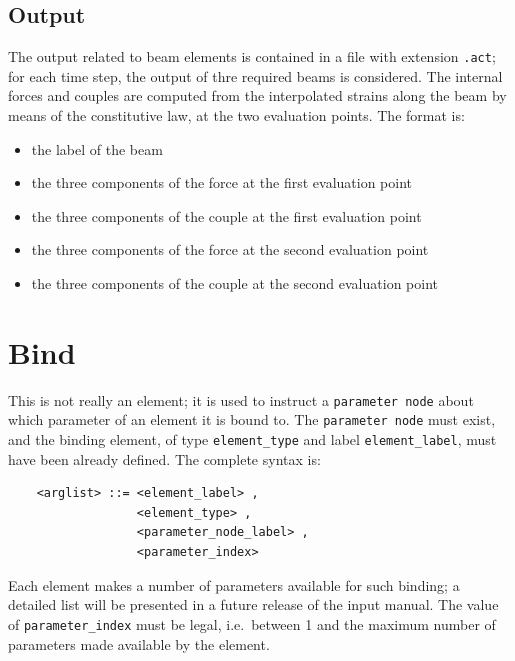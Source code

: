 \documentclass[10pt,dvips]{report}
\begin{document}
\subsection{Output}
The output related to beam elements is contained in a file with extension 
{\tt .act}; for each time step, the output of thre required beams is
considered.
The internal forces and couples are computed from the interpolated strains
along the beam by means of the constitutive law, at the two evaluation
points. 
The format is:
\begin{itemize}
    \item the label of the beam
    \item the three components of the force at the first evaluation point
    \item the three components of the couple at the first evaluation point
    \item the three components of the force at the second evaluation point
    \item the three components of the couple at the second evaluation point    
\end{itemize}



\section{Bind}\label{sec:EL-BIND}
This is not really an element; it is used to instruct a {\tt parameter node}
about which parameter of an element it is bound to.
The {\tt parameter node} must exist, and the binding element, of type 
{\tt element\_type} and label {\tt element\_label}, must have been already 
defined.
The complete syntax is:
\begin{verbatim}
    <arglist> ::= <element_label> , 
                  <element_type> ,
                  <parameter_node_label> , 
                  <parameter_index>
\end{verbatim}
Each element makes a number of parameters available for such binding; a
detailed list will be presented in a future release of the input manual.
The value of {\tt parameter\_index} must be legal, i.e.\ between 1 and the
maximum number of parameters made available by the element.
\end{document}
